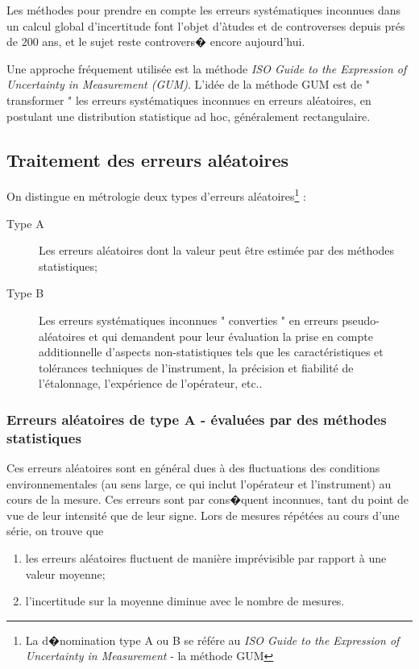 Les méthodes pour prendre en compte les erreurs systématiques inconnues dans un calcul global d'incertitude font l'objet d'àtudes et de controverses depuis prés de 200 ans, et le sujet reste controvers� encore aujourd'hui.

Une approche fréquement utilisée est la méthode \textit{ISO Guide to the Expression of Uncertainty in Measurement (GUM)}. L'idée de la méthode GUM est de " transformer " les erreurs systématiques inconnues en erreurs aléatoires, en postulant une distribution statistique ad hoc, généralement rectangulaire.

\subsection{Traitement des erreurs aléatoires}

On distingue en métrologie deux types d'erreurs aléatoires\footnote{La d�nomination type A ou B se référe au \textit{ISO Guide to the Expression of Uncertainty in Measurement} - la méthode GUM} :
\begin{description}
\item[Type A] Les erreurs aléatoires dont la valeur peut être estimée par des méthodes statistiques;
\item[Type B] Les erreurs systématiques inconnues " converties " en erreurs pseudo-aléatoires et qui demandent pour leur évaluation la prise en compte additionnelle d'aspects non-statistiques tels que les caractéristiques et tolérances techniques de l'instrument, la précision et fiabilité de l'étalonnage, l'expérience de l'opérateur, etc..
\end{description}

\subsubsection{Erreurs aléatoires de type A - évaluées par des méthodes statistiques}

Ces erreurs aléatoires sont en général dues à des fluctuations des conditions environnementales (au sens large, ce qui inclut l'opérateur et l'instrument) au cours de la mesure. Ces erreurs sont par cons�quent inconnues, tant du point de vue de leur intensité que de leur signe. Lors de mesures répétées au cours d'une série, on trouve que
\begin{enumerate}
\item les  erreurs aléatoires fluctuent de manière imprévisible par rapport à une valeur moyenne;
\item l'incertitude sur la moyenne diminue avec le nombre de mesures.
\end{enumerate}

